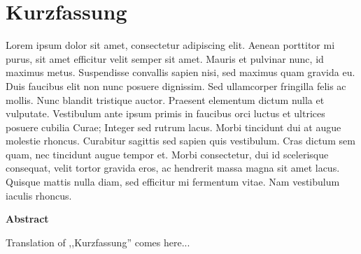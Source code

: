 
\chapter*{Kurzfassung}

 Lorem ipsum dolor sit amet, consectetur adipiscing elit. Aenean porttitor mi purus, sit amet efficitur velit semper sit amet. Mauris et pulvinar nunc, id maximus metus. Suspendisse convallis sapien nisi, sed maximus quam gravida eu. Duis faucibus elit non nunc posuere dignissim. Sed ullamcorper fringilla felis ac mollis. Nunc blandit tristique auctor. Praesent elementum dictum nulla et vulputate. Vestibulum ante ipsum primis in faucibus orci luctus et ultrices posuere cubilia Curae; Integer sed rutrum lacus. Morbi tincidunt dui at augue molestie rhoncus. Curabitur sagittis sed sapien quis vestibulum. Cras dictum sem quam, nec tincidunt augue tempor et. Morbi consectetur, dui id scelerisque consequat, velit tortor gravida eros, ac hendrerit massa magna sit amet lacus. Quisque mattis nulla diam, sed efficitur mi fermentum vitae. Nam vestibulum iaculis rhoncus.

\vspace{3em}
\begin{Huge}
	\textbf{Abstract}
\end{Huge}
\vspace{1.5em}

Translation of ,,Kurzfassung'' comes here...

\clearpage
